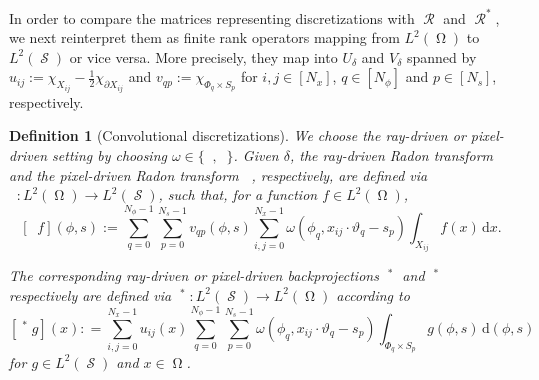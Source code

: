 \documentclass[11pt,reqno]{amsart}
\newcommand{\sumx}{\sum_{i,j=0}^{N_x-1}}
\newcommand{\sums}{\sum_{p=0}^{N_s-1}}
\newcommand{\sumphi}{\sum_{q=0}^{N_\phi-1}}
\DeclareMathOperator{\Radon}{\mathcal{R}}
\DeclareMathOperator{\RayRadon}{\mathcal{R}^\mathrm{rd}_{\delta}}
\DeclareMathOperator{\GenRadon}{\mathcal{R}^\omega_{\delta}}
\DeclareMathOperator{\PixelRadon}{\mathcal{R}^\mathrm{pd}_{\delta}}
\DeclareMathOperator{\RayWeight}{\omega^\mathrm{rd}_{\delta_\mathit{x}}}
\DeclareMathOperator{\PixelWeight}{\omega^\mathrm{pd}_{\delta_\mathit{s}}}
\DeclareMathOperator{\imgdom}{\Omega}
\DeclareMathOperator{\sinodom}{\mathcal{S}}
\newcommand{\dd}[1]{\,\mathrm{d}{#1}}
\numberwithin{theorem}{section}
\newtheorem{definition}[theorem]{Definition}
\theoremstyle{remark}
\begin{document}
In order to compare the matrices representing discretizations with $\Radon$ and $\Radon^*$, we next reinterpret them as finite rank operators mapping from $L^2(\imgdom)$ to $L^2(\sinodom)$ or vice versa. More precisely, they map into $U_\delta$ and $V_\delta$ spanned by $u_{ij}:=\chi_{X_{ij}}-\frac{1}{2}\chi_{\partial X_{ij}}$ and $v_{qp}:=\chi_{\Phi_q\times S_p}$ for $i,j\in [N_x]$, $q\in [N_\phi]$ and $p\in [N_s]$, respectively.
\begin{definition} [Convolutional discretizations]
	We choose the ray-driven or pixel-driven setting by choosing $\omega \in \{\RayWeight,\PixelWeight\}$.
    Given $\delta$, the ray-driven Radon transform $\RayRadon$ and the pixel-driven Radon transform $\PixelRadon$, respectively, are defined via $\GenRadon\colon L^2(\imgdom)\to L^2(\sinodom)$, such that, for a function $f\in L^2(\imgdom)$, 
    \begin{equation}\label{equ_def_convolutional_Radon_transform}
[\GenRadon f](\phi,s) := \sumphi\sums v_{qp}(\phi,s) \sumx \omega (\phi_q,x_{ij}\cdot \vartheta_q -s_p) \int_{X_{ij}} f(x) \dd x.
    \end{equation}

    The corresponding ray-driven or pixel-driven backprojections $\RayRadon^*$ and $\PixelRadon^*$ respectively are  defined via $\GenRadon^*\colon L^2(\sinodom)\to L^2(\imgdom)$ according to
    \begin{equation} \label{equ_def_convolution_backprojection}
        [\GenRadon^* g](x) : =   \sumx u_{ij}(x) \sumphi\sums \omega(\phi_q,x_{ij}\cdot \vartheta_q -s_p) \int_{\Phi_q\times S_p} g(\phi,s) \dd{(\phi,s)}
    \end{equation}
    for $g\in L^2(\sinodom)$ and $x\in \imgdom$. 
\end{definition}



\end{document}
